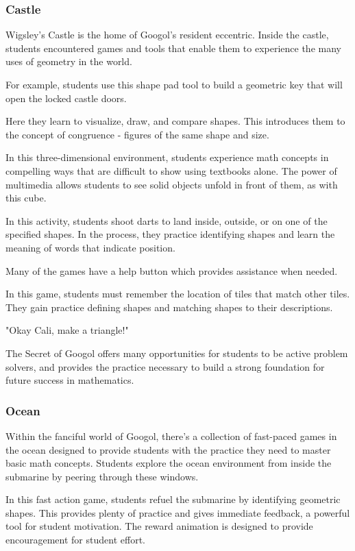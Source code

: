 \subsubsection{Castle}

Wigsley's Castle is the home of Googol's resident eccentric.
Inside the castle, students encountered games and tools that enable them to experience the many uses of geometry in the world.

For example, students use this shape pad tool to build a geometric key that will open the locked castle doors.

Here they learn to visualize, draw, and compare shapes.
This introduces them to the concept of congruence - figures of the same shape and size.

In this three-dimensional environment, students experience math concepts in compelling ways that are difficult to show using textbooks alone.
The power of multimedia allows students to see solid objects unfold in front of them, as with this cube.

In this activity, students shoot darts to land inside, outside, or on one of the specified shapes.
In the process, they practice identifying shapes and learn the meaning of words that indicate position.

Many of the games have a help button which provides assistance when needed.

In this game, students must remember the location of tiles that match other tiles.
They gain practice defining shapes and matching shapes to their descriptions.

"Okay Cali, make a triangle!"

The Secret of Googol offers many opportunities for students to be active problem solvers, and provides the practice necessary to build a strong foundation for future success in mathematics.

\subsubsection{Ocean}

Within the fanciful world of Googol, there's a collection of fast-paced games in the ocean designed to provide students with the practice they need to master basic math concepts.
Students explore the ocean environment from inside the submarine by peering through these windows.

In this fast action game, students refuel the submarine by identifying geometric shapes.
This provides plenty of practice and gives immediate feedback, a powerful tool for student motivation.
The reward animation is designed to provide encouragement for student effort.

